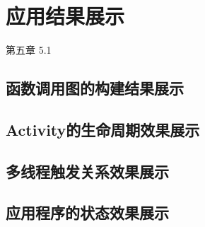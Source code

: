 \chapter{应用结果展示}  
\label{ch5}
第五章	
5.1	
\section{函数调用图的构建结果展示}
\section{Activity的生命周期效果展示}
\section{多线程触发关系效果展示}
\section{应用程序的状态效果展示}

